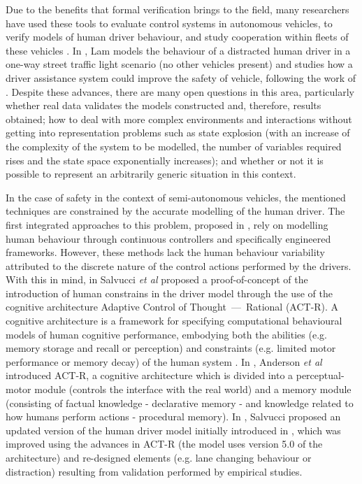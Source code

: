 \documentclass[a4paper]{article}
\begin{document}
Due to the benefits that formal verification brings to the field, many researchers have used these tools to evaluate control systems in autonomous vehicles, to verify models of human driver behaviour, and study cooperation within fleets of these vehicles \cite{fv4, fv2, fv3, fv1}. In \cite{jason}, Lam models the behaviour of a distracted human driver in a one-way street traffic light scenario (no other vehicles present) and studies how a driver assistance system could improve the safety of vehicle, following the work of \cite{salvucci, curzon}. Despite these advances, there are many open questions in this area, particularly whether real data validates the models constructed and, therefore, results obtained; how to deal with more complex environments and interactions without getting into representation problems such as state explosion (with an increase of the complexity of the system to be modelled, the number of variables required rises and the state space exponentially increases); and whether or not it is possible to represent an arbitrarily generic situation in this context.

In the case of safety in the context of semi-autonomous vehicles, the mentioned techniques are constrained by the accurate modelling of the human driver. The first integrated approaches to this problem, proposed in \cite{boer, liu, salvucci1}, rely on modelling human behaviour through continuous controllers and specifically engineered frameworks. However, these methods lack the human behaviour variability attributed to the discrete nature of the control actions performed by the drivers. With this in mind, in \cite{salvucci2} Salvucci \textit{et al} proposed a proof-of-concept of the introduction of human constrains in the driver model through the use of the cognitive architecture Adaptive Control of Thought~—~Rational (ACT-R). A cognitive architecture is a framework for specifying computational behavioural models of human cognitive performance, embodying both the abilities (e.g. memory storage and recall or perception) and constraints (e.g. limited motor performance or memory decay) of the human system \cite{salvucci}. In \cite{act-r}, Anderson \textit{et al} introduced ACT-R, a cognitive architecture which is divided into a perceptual-motor module (controls the interface with the real world) and a memory module (consisting of factual knowledge - declarative memory - and knowledge related to how humans perform actions - procedural memory). In \cite{salvucci}, Salvucci proposed an updated version of the human driver model initially introduced in \cite{salvucci2}, which was improved using the advances in ACT-R (the model uses version 5.0 of the architecture) and re-designed elements (e.g. lane changing behaviour or distraction) resulting from validation performed by empirical studies. 
\end{document}
